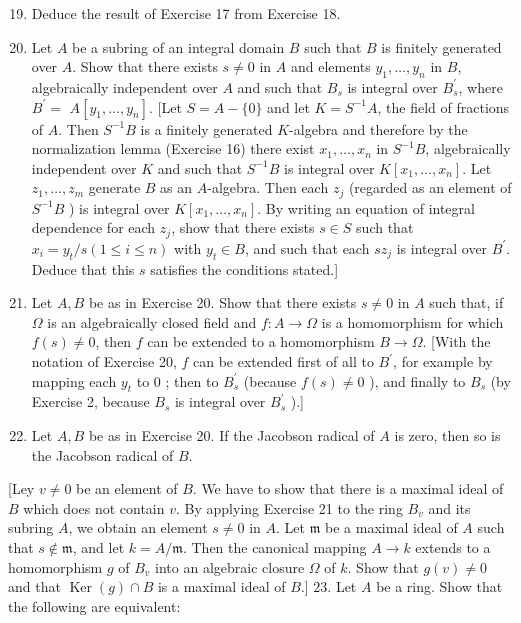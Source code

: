 \documentclass{standalone}
\theoremstyle{definition}
\theoremstyle{remark}
\begin{document}
\begin{enumerate}
  \setcounter{enumi}{18}
  \item Deduce the result of Exercise 17 from Exercise 18.

  \item Let $A$ be a subring of an integral domain $B$ such that $B$ is finitely generated over $A$. Show that there exists $s \neq 0$ in $A$ and elements $y_{1}, \ldots, y_{n}$ in $B$, algebraically independent over $A$ and such that $B_{s}$ is integral over $B_{s}^{\prime}$, where $B^{\prime}=$ $A\left[y_{1}, \ldots, y_{n}\right]$. [Let $S=A-\{0\}$ and let $K=S^{-1} A$, the field of fractions of $A$. Then $S^{-1} B$ is a finitely generated $K$-algebra and therefore by the normalization lemma (Exercise 16) there exist $x_{1}, \ldots, x_{n}$ in $S^{-1} B$, algebraically independent over $K$ and such that $S^{-1} B$ is integral over $K\left[x_{1}, \ldots, x_{n}\right]$. Let $z_{1}, \ldots, z_{m}$ generate $B$ as an $A$-algebra. Then each $z_{j}$ (regarded as an element of $S^{-1} B$ ) is integral over $K\left[x_{1}, \ldots, x_{n}\right]$. By writing an equation of integral dependence for each $z_{j}$, show that there exists $s \in S$ such that $x_{i}=y_{t} / s(1 \leqslant i \leqslant n)$ with $y_{t} \in B$, and such that each $s z_{j}$ is integral over $B^{\prime}$. Deduce that this $s$ satisfies the conditions stated.]

  \item Let $A, B$ be as in Exercise 20. Show that there exists $s \neq 0$ in $A$ such that, if $\Omega$ is an algebraically closed field and $f: A \rightarrow \Omega$ is a homomorphism for which $f(s) \neq 0$, then $f$ can be extended to a homomorphism $B \rightarrow \Omega$. [With the notation of Exercise 20, $f$ can be extended first of all to $B^{\prime}$, for example by mapping each $y_{t}$ to 0 ; then to $B_{s}^{\prime}$ (because $f(s) \neq 0$ ), and finally to $B_{s}$ (by Exercise 2, because $B_{s}$ is integral over $B_{s}^{\prime}$ ).]

  \item Let $A, B$ be as in Exercise 20. If the Jacobson radical of $A$ is zero, then so is the Jacobson radical of $B$.

\end{enumerate}

[Ley $v \neq 0$ be an element of $B$. We have to show that there is a maximal ideal of $B$ which does not contain $v$. By applying Exercise 21 to the ring $B_{v}$ and its subring $A$, we obtain an element $s \neq 0$ in $A$. Let $\mathfrak{m}$ be a maximal ideal of $A$ such that $s \notin \mathfrak{m}$, and let $k=A / \mathfrak{m}$. Then the canonical mapping $A \rightarrow k$ extends to a homomorphism $g$ of $B_{v}$ into an algebraic closure $\Omega$ of $k$. Show that $g(v) \neq 0$ and that $\operatorname{Ker}(g) \cap B$ is a maximal ideal of $B$.] 23. Let $A$ be a ring. Show that the following are equivalent:
\end{document}
